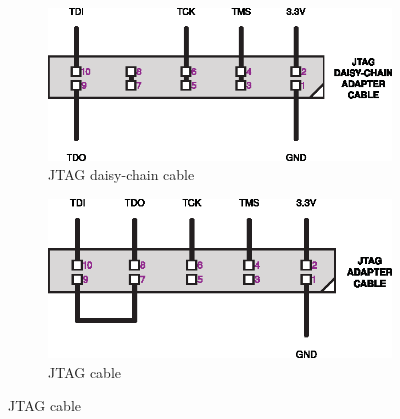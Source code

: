 \documentclass{article}
\begin{document}
\begin{figure}[H]
  \centering
  \begin{subfigure}{0.5\textwidth}
    \centering
    \includegraphics[width=0.8\linewidth]{cs_jtag_daisy-chain_adapter_cable}
    \caption{JTAG daisy-chain cable}
    \label{fig:jtagdaisychaincable}
  \end{subfigure}%
  \begin{subfigure}{0.5\textwidth}
    \centering
    \includegraphics[width=0.8\linewidth]{cs_jtag_adapter_cable}
    \caption{JTAG cable}
    \label{fig:jtagcable}
  \end{subfigure}
\end{figure}



\end{document}
